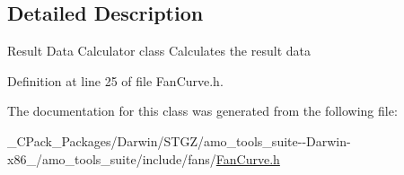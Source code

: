 \subsection{Detailed Description}
Result Data Calculator class Calculates the result data 

Definition at line 25 of file Fan\+Curve.\+h.



The documentation for this class was generated from the following file\+:\begin{DoxyCompactItemize}
\item 
\+\_\+\+C\+Pack\+\_\+\+Packages/\+Darwin/\+S\+T\+G\+Z/amo\+\_\+tools\+\_\+suite-\/-\/\+Darwin-\/x86\+\_/amo\+\_\+tools\+\_\+suite/include/fans/\hyperlink{___c_pack___packages_2_darwin_2_s_t_g_z_2amo__tools__suite--_darwin-x86__64_2amo__tools__suite_2include_2fans_2_fan_curve_8h}{Fan\+Curve.\+h}\end{DoxyCompactItemize}
